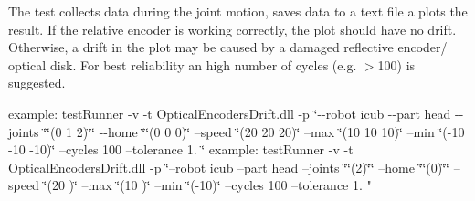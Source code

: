 The test collects data during the joint motion, saves data to a text file a plots the result. If the relative encoder is working correctly, the plot should have no drift. Otherwise, a drift in the plot may be caused by a damaged reflective encoder/ optical disk. For best reliability an high number of cycles (e.\+g. $>$100) is suggested.

example\+: test\+Runner -\/v -\/t Optical\+Encoders\+Drift.\+dll -\/p \char`\"{}-\/-\/robot icub -\/-\/part head -\/-\/joints \char`\"{}\char`\"{}(0 1 2)\char`\"{}\char`\"{} -\/-\/home \char`\"{}\char`\"{}(0 0 0)\char`\"{} --speed \char`\"{}(20 20 20)\char`\"{} --max \char`\"{}(10 10 10)\char`\"{} --min \char`\"{}(-\/10 -\/10 -\/10)\char`\"{} --cycles 100 --tolerance 1. \char`\"{}
example\+: test\+Runner -\/v -\/t Optical\+Encoders\+Drift.\+dll -\/p \char`\"{}--robot icub --part head --joints \char`\"{}\char`\"{}(2)\char`\"{}\char`\"{} --home \char`\"{}\char`\"{}(0)\char`\"{}\char`\"{} --speed \char`\"{}(20      )\char`\"{} --max \char`\"{}(10      )\char`\"{} --min \char`\"{}(-\/10)\char`\"{} --cycles 100 --tolerance 1. "

